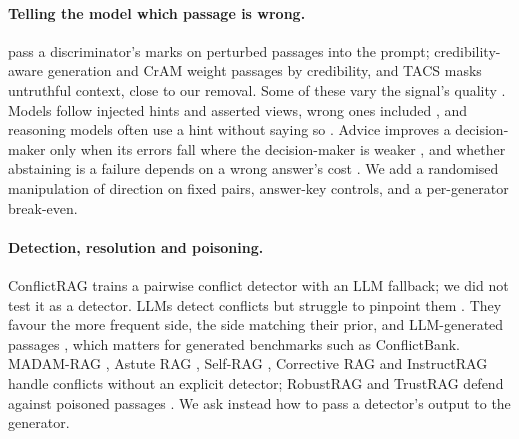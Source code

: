 \paragraph{Telling the model which passage is wrong.}
\citet{hong2024gullible} pass a discriminator's marks on perturbed passages into the prompt; credibility-aware
generation \citep{pan2024credibility} and CrAM \citep{deng2025cram} weight passages by credibility, and TACS
\citep{yu2024tacs} masks untruthful context, close to our removal. Some of these vary the signal's quality
\citep{hong2024gullible,pan2024credibility}. Models follow injected hints and asserted views, wrong ones included
\citep{turpin2023unfaithful,sharma2024sycophancy}, and reasoning models often use a hint without saying so
\citep{chen2025reasoning}. Advice improves a decision-maker only when its errors fall where the decision-maker is
weaker \citep{bansal2021accurate,mozannar2020defer}, and whether abstaining is a failure depends on a wrong answer's
cost \citep{wen2025abstention,song2025trustscore}. We add a randomised manipulation of direction on fixed pairs,
answer-key controls, and a per-generator break-even.

\paragraph{Detection, resolution and poisoning.}
ConflictRAG \citep{wang2026conflictrag} trains a pairwise conflict detector with an LLM fallback; we did not test it
as a detector. LLMs detect conflicts but struggle to pinpoint them
\citep{gokul2025contradiction,wang2024resolving,jiayang2024econ}. They favour the more frequent side, the side
matching their prior, and LLM-generated passages \citep{jin2024tugofwar,kortukov2024realistic,tan2024blinded}, which
matters for generated benchmarks such as ConflictBank. MADAM-RAG \citep{wang2025madam}, Astute RAG
\citep{wang2025astute}, Self-RAG \citep{asai2024selfrag}, Corrective RAG \citep{yan2024crag} and InstructRAG
\citep{wei2025instructrag} handle conflicts without an explicit detector; RobustRAG \citep{xiang2024robustrag} and
TrustRAG \citep{zhou2025trustrag} defend against poisoned passages \citep{zou2025poisonedrag}. We ask instead how to
pass a detector's output to the generator.
